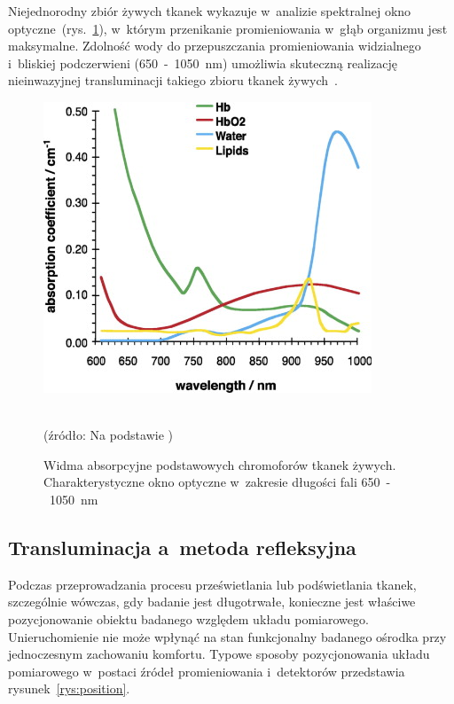 Niejednorodny zbiór żywych tkanek wykazuje w~analizie spektralnej okno optyczne~(rys.~\ref{rys:window}), w~którym przenikanie promieniowania w~głąb organizmu jest maksymalne. 
Zdolność wody do przepuszczania promieniowania widzialnego i~bliskiej podczerwieni (650~-~1050~nm) umożliwia skuteczną realizację nieinwazyjnej transluminacji takiego zbioru 
tkanek żywych~\cite{Cys:2007}. 
\begin{figure}[ht]
\centerline{\includegraphics[scale = 1.20]{graphic/window.jpg}}
	\caption{Widma absorpcyjne podstawowych chromoforów tkanek żywych. Charakterystyczne okno optyczne w~zakresie długości fali 650~-~1050~nm}
	\label{rys:window}
	~\\
	(źródło: Na podstawie \cite{Haggblad:2008})
\end{figure}

\subsection{Transluminacja a~metoda refleksyjna}
\label{subsec:TransReflex}

Podczas przeprowadzania procesu prześwietlania lub podświetlania tkanek, szczególnie wówczas, gdy badanie jest długotrwałe, konieczne jest właściwe pozycjonowanie obiektu badanego 
względem układu pomiarowego. Unieruchomienie nie może wpłynąć na stan funkcjonalny badanego ośrodka przy jednoczesnym zachowaniu komfortu. Typowe sposoby pozycjonowania układu 
pomiarowego w~postaci źródeł promieniowania i~detektorów przedstawia rysunek~\ref{rys:position}. 

